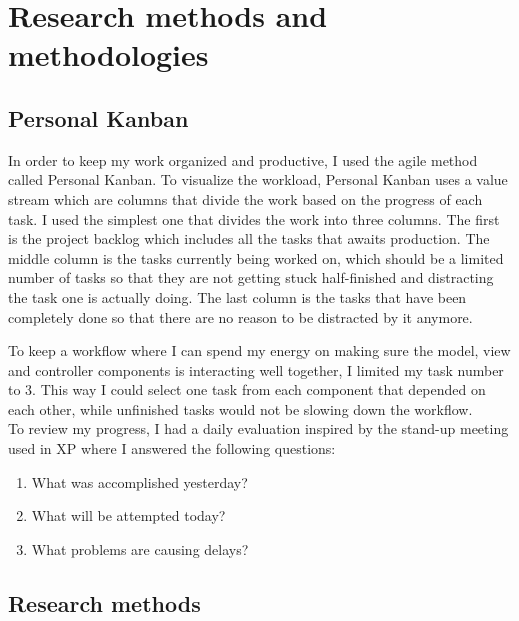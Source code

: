 
\chapter{Research methods and methodologies} %

\label{Chapter3} %


\section{Personal Kanban}
In order to keep my work organized and productive, I used the agile method called Personal Kanban. To visualize the workload, Personal Kanban uses a value stream which are columns that divide the work based on the progress of each task. I used the simplest one that divides the work into three columns. The first is the project backlog which includes all the tasks that awaits production. The middle column is the tasks currently being worked on, which should be a limited number of tasks so that they are not getting stuck half-finished and distracting the task one is actually doing. The last column is the tasks that have been completely done so that there are no reason to be distracted by it anymore. \parencite{benson2009}

To keep a workflow where I can spend my energy on making sure the model, view and controller components is interacting well together, I limited my task number to 3. This way I could select one task from each component that depended on each other, while unfinished tasks would not be slowing down the workflow.\\
To review my progress, I had a daily evaluation inspired by the stand-up meeting used in XP \parencite{wells1999} where I answered the following questions:
\begin{enumerate}
\item What was accomplished yesterday?
\item What will be attempted today?
\item What problems are causing delays?
\end{enumerate}



\section{Research methods}

